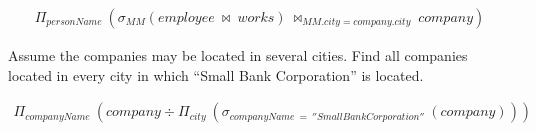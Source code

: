 \begin{problem}
\begin{enumalph}
    \begin{Answer}
      \begin{align*}
        \Pi_{personName}\ (\sigma_{MM}(employee\ \Join\ works)\ \Join_{MM.city = company.city}\ company)
      \end{align*}
      
    \end{Answer}
    
    \item Assume the companies may be located in several cities.
    Find all companies located in every city in which 
    ``Small Bank Corporation'' is located.
    
    \begin{Answer}
      \begin{align*}
        \Pi_{companyName}\ (company \div \Pi_{city}\ (\sigma_{companyName\ = \ ''Small Bank Corporation''}\ (company)))
      \end{align*}
    \end{Answer}
    
  \end{enumalph}
\end{problem}
